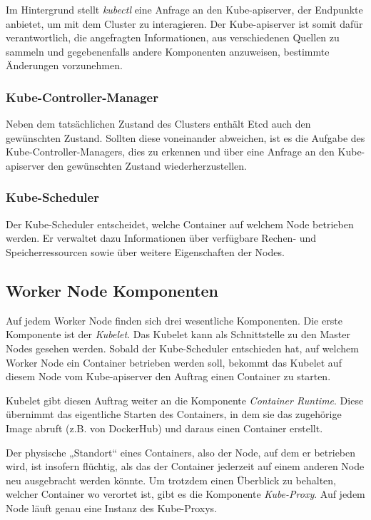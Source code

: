 \documentclass[11pt,a4paper]{article}
\begin{document}
Im Hintergrund stellt \emph{kubectl} eine Anfrage an den Kube-apiserver, der Endpunkte anbietet,
um mit dem Cluster zu interagieren. Der Kube-apiserver ist somit dafür verantwortlich, die angefragten Informationen,
aus verschiedenen Quellen zu sammeln und gegebenenfalls andere Komponenten anzuweisen, bestimmte Änderungen vorzunehmen.

\subsubsection{Kube-Controller-Manager}
Neben dem tatsächlichen Zustand des Clusters enthält Etcd auch den gewünschten Zustand.
Sollten diese voneinander abweichen, ist es die Aufgabe des Kube-Controller-Managers,
dies zu erkennen und über eine Anfrage an den Kube-apiserver den gewünschten Zustand wiederherzustellen.


\subsubsection{Kube-Scheduler}
\label{sec:Kube-Scheduler}
Der Kube-Scheduler entscheidet, welche Container auf welchem Node betrieben werden.
Er verwaltet dazu Informationen über verfügbare Rechen- und Speicherressourcen sowie über weitere Eigenschaften
der Nodes.

\subsection{Worker Node Komponenten}

Auf jedem Worker Node finden sich drei wesentliche Komponenten.
Die erste Komponente ist der \emph{Kubelet}. Das Kubelet kann als Schnittstelle
zu den Master Nodes gesehen werden. Sobald der Kube-Scheduler entschieden hat, auf welchem
Worker Node ein Container betrieben werden soll, bekommt das Kubelet auf diesem Node
vom Kube-apiserver den Auftrag einen Container zu starten.

Kubelet gibt diesen Auftrag weiter an die Komponente \emph{Container Runtime}.
Diese übernimmt das eigentliche Starten des Containers, in dem sie das zugehörige Image
abruft (z.B. von DockerHub) und daraus einen Container erstellt.

Der physische „Standort“ eines Containers, also der Node, auf dem er betrieben wird, ist insofern
flüchtig, als das der Container jederzeit auf einem anderen Node neu ausgebracht werden könnte.
Um trotzdem einen Überblick zu behalten, welcher Container wo verortet ist, gibt es die Komponente
\emph{Kube-Proxy}. Auf jedem Node läuft genau eine Instanz des Kube-Proxys.
\end{document}
